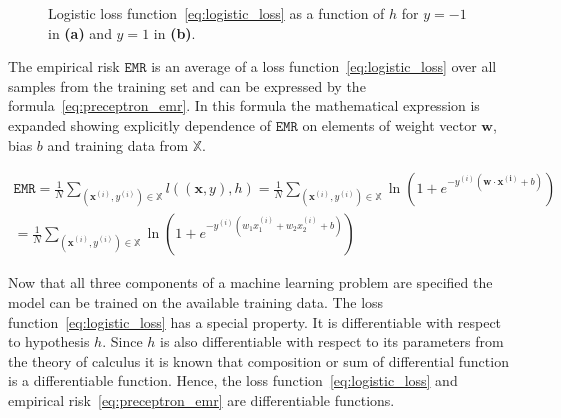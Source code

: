 \documentclass[english, 12pt, a4paper, elec, utf8, online]{aaltothesis}
\begin{document}
\usetikzlibrary{datavisualization}
\usetikzlibrary{datavisualization.formats.functions}
\begin{figure}[h!]
\centering
{}

\caption{Logistic loss function~\ref{eq:logistic_loss} as a function of $h$  for $y=-1$ in \textbf{(a)} and $y=1$ in \textbf{(b)}.}\label{fig:logistic_loss}
\end{figure}

The empirical risk $\mathtt{EMR}$ is an average of a loss function~\ref{eq:logistic_loss} over all samples from the training set and can be expressed by the formula~\ref{eq:preceptron_emr}. In this formula the mathematical expression is expanded showing explicitly dependence of $\mathtt{EMR}$ on elements of weight vector $\mathbf{w}$, bias $b$ and training data from $\mathbb{X}$.

\begin{align}\label{eq:preceptron_emr}
\mathtt{EMR} = \frac{1}{N}\sum_{(\mathbf{x}^{(i)}, y^{(i)}) \in \mathbb{X}}{l((\mathbf{x},y),h)} = \frac{1}{N}\sum_{(\mathbf{x}^{(i)}, y^{(i)}) \in \mathbb{X}}{\ln(1+e^{-y^{(i)} ( \mathbf{w} \cdot \mathbf{x^{(i)}} + b) })} \\= \frac{1}{N}\sum_{(\mathbf{x}^{(i)}, y^{(i)}) \in \mathbb{X}}{\ln(1+e^{-y^{(i)} ( w_1 x_{1}^{(i)} + w_2 x_{2}^{(i)} + b) })}
\end{align}

Now that all three components of a machine learning problem are specified the model can be trained on the available training data. The loss function~\ref{eq:logistic_loss} has a special property. It is differentiable with respect to hypothesis $h$. Since $h$ is also differentiable with respect to its parameters from the theory of calculus it is known that composition or sum of differential function is a differentiable function. Hence, the loss function~\ref{eq:logistic_loss} and empirical risk~\ref{eq:preceptron_emr} are differentiable functions.                  
\end{document}
